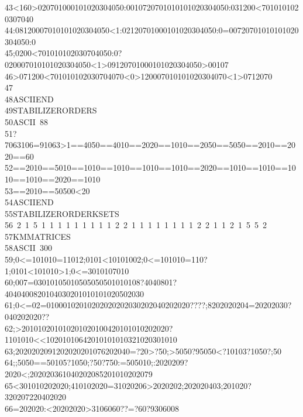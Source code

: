\begin{tabbing}
43<160>020701000101020304050:0010720701010101020304050:031200<7010101020307040\\[-7pt]
44:08120007010101020304050<1:02120701000101020304050:0=00720701010101020304050:0\\[-7pt]
45\>;0200<701010102030704050:0?020007010101020304050<1>09120701000101020304050>00107\\[-7pt]
46>071200<701010102030704070<0>120007010101020304070<1>0712070\\[-7pt]
47\\[-7pt]
48\>ASCIIEND\\[-7pt]
49\>STABILIZERORDERS\\[-7pt]
50\>ASCII\ 88\\[-7pt]
51?7063106=91063>1==4050==4010==2020==1010==2050==5050==2010==2020==60\\[-7pt]
52==2010==5010==1010==1010==1010==1010==2020==1010==1010==1010==1010==2020==1010\\[-7pt]
53\>==2010==50500<20\\[-7pt]
54\>ASCIIEND\\[-7pt]
55\>STABILIZERORDERKSETS\\[-7pt]
56\ 2\ 1\ 5\ 1\ 1\ 1\ 1\ 1\ 1\ 1\ 1\ 1\ 2\ 2\ 1\ 1\ 1\ 1\ 1\ 1\ 1\ 1\ 2\ 2\ 1\ 1\ 2\ 1\ 5\ 5\ 2\ \\[-7pt]
57\>KMMATRICES\\[-7pt]
58\>ASCII\ 300\\[-7pt]
59;0<=101010=11012;0101<10101002;0<=101010=110?1;0101<101010>1;0<=3010107010\\[-7pt]
60;007=03010105010505050501010108?4040801?4040400820104030201010101020502030\\[-7pt]
61;0<=02=01000102010202020202030202040202020????;8202020204=20202030?040202020??\\[-7pt]
62\>;>201010201010201020100420101010202020?1101010<<10201010642010101010321020301010\\[-7pt]
63;2020202091202020201076202040=?20>?50;>5050?95050<?10103?1050?;50\\[-7pt]
64\>;;5050==50105?1050;?50?750:=505010;:2020209?2020<;202020361040202085201010202079\\[-7pt]
65<301010202020;410102020=31020206>2020202;202020403;201020?320207220402020\\[-7pt]
66=202020:<20202020>3106060??=?60?9306008\\[-7pt]

\end{tabbing}
